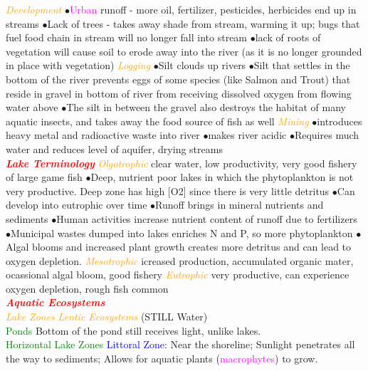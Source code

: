 \documentclass{article}
\newcommand{\ddd}{$\bullet$}
\newcommand{\red}[1]{\textcolor{red}{#1}}
\newcommand{\green}[1]{\textcolor{green}{#1}}
\newcommand{\blue}[1]{\textcolor{blue}{#1}}
\newcommand{\pink}[1]{\textcolor{magenta}{#1}}
\newcommand{\orange}[1]{\textcolor{orange}{#1}}
\newcommand{\mysection}[1]{\textbf{\textit{\red{#1}}}}
\newcommand{\mysubsection}[1]{{\textit{\orange{#1}}}}
\newcommand{\mysubsub}[1]{{{\green{#1}}}}
\newcommand{\mysubsubsub}[1]{{{\blue{#1}}}}
\newcommand{\vocab}[1]{{\pink{#1}}}
\begin{document}
\begin{multicols*}{4}
        \mysubsection{Development}
            \ddd \vocab{Urban} runoff - more oil, fertilizer, pesticides, herbicides end up in streams
            \ddd Lack of trees - takes away shade from stream, warming it up; bugs that fuel food chain in stream will no longer fall into stream
            \ddd lack of roots of vegetation will cause soil to erode away into the river (as it is no longer grounded in place with vegetation) 
        \mysubsection{Logging}
            \ddd Silt clouds up rivers
            \ddd Silt that settles in the bottom of the river prevents eggs of some species (like Salmon and Trout) that reside in gravel in bottom of river from receiving dissolved oxygen from flowing water above
            \ddd The silt in between the gravel also destroys the habitat of many aquatic insects, and takes away the food source of fish as well
        \mysubsection{Mining}
            \ddd introduces heavy metal and radioactive waste into river
            \ddd makes river acidic
            \ddd Requires much water and reduces level of aquifer, drying streams
    \\
    \mysection{Lake Terminology}
        \mysubsection{Olgotrophic} clear water, low productivity, very good fishery of large game fish
            \ddd Deep, nutrient poor lakes in which the phytoplankton is not very productive. Deep zone has high [O2] since there is very little detritus
            \ddd Can develop into eutrophic over time
            \ddd Runoff brings in mineral nutrients and sediments
            \ddd Human activities increase nutrient content of runoff due to fertilizers
            \ddd Municipal wastes dumped into lakes enriches N and P, so more phytoplankton
            \ddd Algal blooms and increased plant growth creates more detritus and can lead to oxygen depletion.
        \mysubsection{Mesotrophic} icreased production, accumulated organic mater, ocassional algal bloom, good fishery
        \mysubsection{Eutrophic} very productive, can experience oxygen depletion, rough fish common
    \\
    \mysection{Aquatic Ecosystems} \\
        \mysubsection{Lake Zones}
            \mysubsection{Lentic Ecosystems} (STILL Water) \\
            \mysubsub{Ponds} Bottom of the pond still receives light, unlike lakes.
            \\
            \mysubsub{Horizontal Lake Zones}
                \mysubsubsub{Littoral Zone}: Near the shoreline; Sunlight penetrates all the way to sediments; Allows for aquatic plants (\vocab{macrophytes}) to grow.

\end{multicols*}
\end{document}
